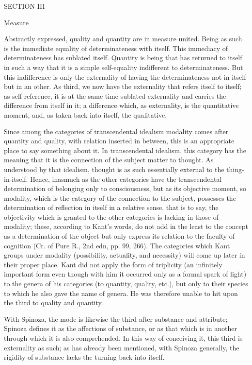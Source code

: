 SECTION III

Measure

Abstractly expressed, quality and quantity are in measure united.
Being as such is the immediate equality of determinateness with itself.
This immediacy of determinateness has sublated itself.
Quantity is being that has returned to itself in such a way
that it is a simple self-equality indifferent to determinateness.
But this indifference is only the externality of having
the determinateness not in itself but in an other.
As third, we now have the externality that refers itself to itself;
as self-reference, it is at the same time sublated externality and
carries the difference from itself in it;
a difference which, as externality, is the quantitative moment,
and, as taken back into itself, the qualitative.

Since among the categories of transcendental idealism
modality comes after quantity and quality,
with relation inserted in between,
this is an appropriate place to say something about it.
In transcendental idealism, this category has the meaning that
it is the connection of the subject matter to thought.
As understood by that idealism, thought is as such
essentially external to the thing-in-itself.
Hence, inasmuch as the other categories have
the transcendental determination of
belonging only to consciousness,
but as its objective moment,
so modality, which is the category of
the connection to the subject,
possesses the determination of
reflection in itself in a relative sense,
that is to say, the objectivity
which is granted to the other categories
is lacking in those of modality;
these, according to Kant's words,
do not add in the least to the concept
as a determination of the object
but only express its relation to the faculty of cognition
(Cr. of Pure R., 2nd edn, pp. 99, 266).
The categories which Kant groups under modality
(possibility, actuality, and necessity)
will come up later in their proper place.
Kant did not apply the form of triplicity
(an infinitely important form even though with him
it occurred only as a formal spark of light)
to the genera of his categories (to quantity, quality, etc.),
but only to their species to which he also gave the name of genera.
He was therefore unable to hit upon the third to quality and quantity.

With Spinoza, the mode is likewise the third after substance and attribute;
Spinoza defines it as the affections of substance,
or as that which is in another through which it is also comprehended.
In this way of conceiving it, this third is externality as such;
as has already been mentioned, with Spinoza generally,
the rigidity of substance lacks the turning back into itself.

